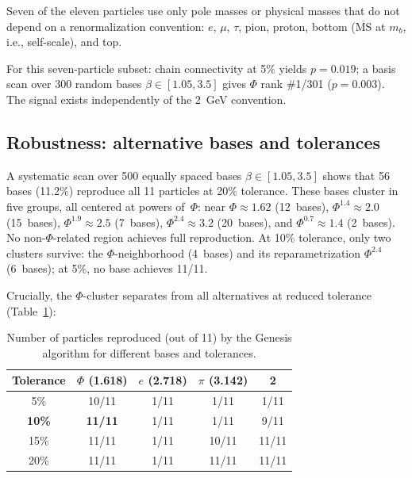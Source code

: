 \documentclass[11pt,a4paper]{article}
\begin{document}
Seven of the eleven particles use only pole masses or physical masses
that do not depend on a renormalization convention: $e$, $\mu$, $\tau$,
pion, proton, bottom ($\overline{\text{MS}}$ at $m_b$, i.e.,
self-scale), and top.

For this seven-particle subset: chain connectivity at 5\% yields
$p = 0.019$; a basis scan over 300 random bases $\beta \in [1.05, 3.5]$
gives $\Phi$ rank \#1/301 ($p = 0.003$). The signal exists
independently of the 2~GeV convention.

\subsection{Robustness: alternative bases and tolerances}
\label{sec:robustness}

A systematic scan over 500 equally spaced bases
$\beta \in [1.05, 3.5]$ shows that 56 bases (11.2\%) reproduce
all 11 particles at 20\% tolerance. These bases cluster in five
groups, all centered at powers of~$\Phi$: near $\Phi \approx 1.62$
(12~bases), $\Phi^{1.4} \approx 2.0$ (15~bases),
$\Phi^{1.9} \approx 2.5$ (7~bases),
$\Phi^{2.4} \approx 3.2$ (20~bases), and $\Phi^{0.7} \approx 1.4$
(2~bases). No non-$\Phi$-related region achieves full reproduction.
At 10\% tolerance, only two clusters survive: the $\Phi$-neighborhood
(4~bases) and its reparametrization $\Phi^{2.4}$ (6~bases); at 5\%,
no base achieves 11/11.

Crucially, the $\Phi$-cluster separates from all alternatives at
reduced tolerance (Table~\ref{tab:tol_sensitivity}):

\begin{table}[h]
\centering
\caption{Number of particles reproduced (out of 11) by the Genesis
algorithm for different bases and tolerances.}
\label{tab:tol_sensitivity}
\begin{tabular}{@{}ccccc@{}}
\toprule
Tolerance & $\Phi$ (1.618) & $e$ (2.718) & $\pi$ (3.142) & 2 \\
\midrule
5\%  & 10/11 & 1/11 & 1/11 & 1/11 \\
\textbf{10\%} & \textbf{11/11} & 1/11 & 1/11 & 9/11 \\
15\% & 11/11 & 1/11 & 10/11 & 11/11 \\
20\% & 11/11 & 1/11 & 11/11 & 11/11 \\
\bottomrule
\end{tabular}
\end{table}
\end{document}
